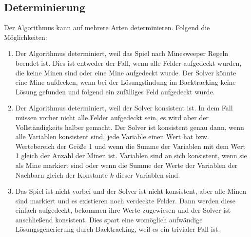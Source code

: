 \subsection{Determinierung}

Der Algorithmus kann auf mehrere Arten determinieren. Folgend die Möglichkeiten:
\begin{enumerate}
    \item Der Algorithmus determiniert, weil das Spiel nach Minesweeper Regeln beendet ist. Dies ist entweder der Fall, wenn alle Felder aufgedeckt
    wurden, die keine Minen sind oder eine Mine aufgedeckt wurde. Der Solver könnte eine Mine aufdecken, wenn bei der Lösungsfindung im Backtracking keine Lösung
    gefunden und folgend ein zufälliges Feld aufgedeckt wurde.
    \item Der Algorithmus determiniert, weil der Solver konsistent ist. In dem Fall müssen vorher nicht alle Felder aufgedeckt sein, es wird
    aber der Vollständigkeits halber gemacht. Der Solver ist konsistent genau dann, wenn alle Variablen konsistent sind, 
    jede Variable einen Wert hat bzw. Wertebereich der Größe 1 und wenn die Summe der Variablen mit dem Wert 1 gleich der Anzahl der Minen ist.
    Variablen sind an sich konsistent, wenn sie als Mine markiert sind oder wenn die Summe der Werte der Variablen der Nachbarn gleich der
    Konstante $k$ dieser Variablen sind.
    \item Das Spiel ist nicht vorbei und der Solver ist nicht konsistent, aber alle Minen sind markiert und es existieren noch verdeckte Felder.
    Dann werden diese einfach aufgedeckt, bekommen ihre Werte zugewiesen und der Solver ist anschließend konsistent. Dies spart eine womöglich
    aufwändige Lösungsgenerierung durch Backtracking, weil es ein trivialer Fall ist.
\end{enumerate}
